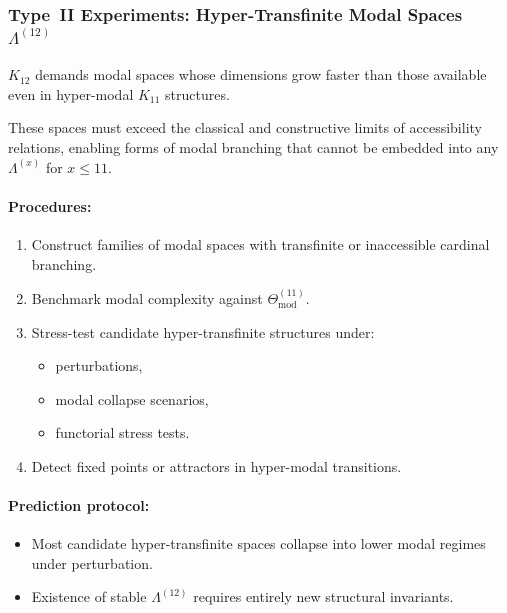 \subsubsection{Type~II Experiments: Hyper-Transfinite Modal Spaces $\Lambda^{(12)}$}

$K_{12}$ demands modal spaces whose dimensions grow faster than those
available even in hyper-modal $K_{11}$ structures.

These spaces must exceed the classical and constructive limits
of accessibility relations, enabling forms of modal branching
that cannot be embedded into any $\Lambda^{(x)}$ for $x \le 11$.

\paragraph{Procedures:}

\begin{enumerate}
    \item Construct families of modal spaces with transfinite or
          inaccessible cardinal branching.
    \item Benchmark modal complexity against
          $\Theta_{\mathrm{mod}}^{(11)}$.
    \item Stress-test candidate hyper-transfinite structures under:
          \begin{itemize}
              \item perturbations,
              \item modal collapse scenarios,
              \item functorial stress tests.
          \end{itemize}
    \item Detect fixed points or attractors in hyper-modal transitions.
\end{enumerate}

\paragraph{Prediction protocol:}

\begin{itemize}
    \item Most candidate hyper-transfinite spaces collapse into
          lower modal regimes under perturbation.
    \item Existence of stable $\Lambda^{(12)}$ requires entirely new
          structural invariants.
\end{itemize}




